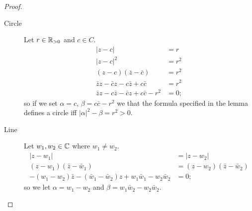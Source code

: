 \begin{proof}
    \begin{description}
        \item[Circle] 
            Let $r \in \mathbb{R}_{>0}$ and $c \in C$.
            \begin{align*}
                \lvert z - c \rvert &= r \\
                \lvert z - c \lvert ^2 &= r^2 \\
                (z - c)(\bar z - \bar c) &= r^2 \\
                \bar z z - \bar c z - c \bar z + c \bar c &= r^2 \\
                \bar z z - c \bar z - \bar c z + c \bar c - r^2 &= 0;
            \end{align*}
            so if we set $\alpha = c$, $\beta = c \bar c - r^2$ we that the formula specified in the lemma defines a circle iff $\lvert \alpha \rvert ^2 - \beta = r^2 > 0$.

        \item[Line]
            Let $w_1, w_2 \in \mathbb{C}$ where $w_1 \neq w_2$.
            \begin{align*}
                \lvert z - w_1 \rvert &= \lvert z - w_2 \rvert \\
                (z - w_1)(\bar z - \bar w_1) &= (z - w_2)(\bar z - \bar w_2) \\
                -(w_1 - w_2) \bar z - (\bar w_1 - \bar w_2) z + w_1 \bar w_1 - w_2 \bar w_2 &= 0;
            \end{align*}
            so we let $\alpha = w_1 - w_2$ and $\beta = w_1 \bar w_2 - w_2 \bar w_2$.
    \end{description}
\end{proof}

